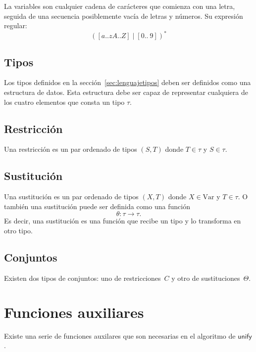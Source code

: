 \documentclass{article}
\newcommand{\ms}[1]{\mathsf{#1}}
\theoremstyle{definition}
\begin{document}
La variables son cualquier cadena de carácteres que comienza con una letra,
seguida de una secuencia posiblemente vacía de letras y números. Su expresión
regular:
\begin{equation*}
  [a..zA..Z]([a..zA..Z] \mid [0 ..\ 9])^*
\end{equation*}

\subsection{Tipos}
\label{sec:estrutipos}

Los tipos definidos en la sección~\ref{sec:lenguajetipos} deben ser
definidos como una estructura de datos. Esta estructura debe ser capaz
de representar cualquiera de los cuatro elementos que consta un tipo
$\tau$.

\subsection{Restricción}
\label{sec:estrurest}

Una restricción es un par ordenado de tipos $(S,T)$ donde $T \in \tau$
y $S \in \tau$.

\subsection{Sustitución}
\label{sec:estrsust}

Una sustitución es un par ordenado de tipos $(X,T)$ donde
$X \in \text{Var}$ y $T \in \tau$. O también una sustitución puede ser
definida como una función
\begin{equation*}
  \theta : \tau \to \tau.
\end{equation*}
Es decir, una sustitución es una función que recibe un tipo y lo
transforma en otro tipo.

\subsection{Conjuntos}
\label{sec:conjuntos}

Existen dos tipos de conjuntos: uno de restricciones~$C$ y otro de
sustituciones~$\Theta$.


\section{Funciones auxiliares}
\label{sec:funaux}

Existe una serie de funciones auxilares que son necesarias en el
algoritmo de $\ms{unify}$.
\end{document}
